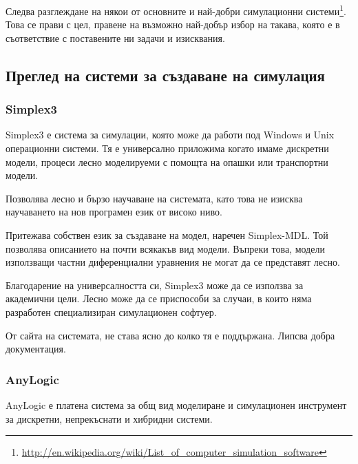 		Следва разглеждане на някои от основните и най-добри симулационни 
		системи\footnote{\url{http://en.wikipedia.org/wiki/List_of_computer_simulation_software}}.
		Това се прави с цел, правене на възможно най-добър избор на такава, която е в съответствие
		с поставените ни задачи и изисквания. 
	
	\subsection{Преглед на системи за създаване на симулация}
	
		\subsubsection{Simplex3}
		
			Simplex3 е система за симулации, която може да работи под Windows и Unix операционни системи.
			Тя е универсално приложима когато имаме дискретни модели, процеси 
			лесно моделируеми с помощта на опашки или транспортни модели.
			
 
				Позволява лесно и бързо научаване на системата, като това не изисква
				научаването на нов програмен език от високо ниво.			

				
				Притежава собствен език за създаване на модел, наречен Simplex-MDL. 
				Той позволява описанието на почти всякакъв вид модели. Въпреки това,
				модели използващи частни диференциални уравнения не могат да се представят
				лесно.
			
			
				Благодарение на универсалността си, Simplex3 може да се използва за академични цели.
				Лесно може да се приспособи за случаи, в които няма разработен специализиран симулационен
				софтуер. 
			
			
				От сайта на системата, не става ясно до колко тя е поддържана. 
				Липсва добра документация.\cite{Simplex3}
		
		\subsubsection{AnyLogic}
		
			AnyLogic е платена система за общ вид моделиране и симулационен инструмент за 
			дискретни, непрекъснати и хибридни системи.
			
